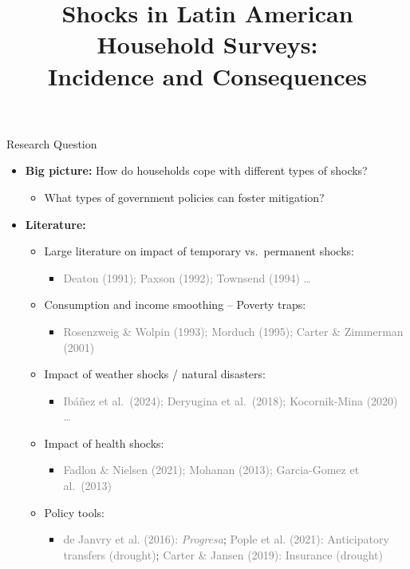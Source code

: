 \documentclass[aspectratio = 169]{beamer}
\title[]{Shocks in Latin American Household Surveys: \\ Incidence and Consequences}
\date{
	
	April 2025}
\begin{document}
\begin{frame}
  \titlepage
\end{frame}
\begin{frame}{Research Question}

	\begin{itemize}
  
	  \item \textbf{Big picture:} How do households cope with different types of shocks?
		\begin{itemize}
		  \item What types of government policies can foster mitigation?
		\end{itemize}
		\bigskip
  
	  \item \textbf{Literature:}
		\begin{itemize}
  
		  \item Large literature on impact of temporary vs.\ permanent shocks:
			\begin{itemize}
			  \item \textcolor{gray}{Deaton (1991); Paxson (1992); Townsend (1994) \dots}
			\end{itemize}
			\smallskip
  
		  \item Consumption and income smoothing – Poverty traps:
			\begin{itemize}
			  \item \textcolor{gray}{Rosenzweig \& Wolpin (1993); Morduch (1995); Carter \& Zimmerman (2001)}
			\end{itemize}
			\smallskip
  
		  \item Impact of weather shocks / natural disasters:
			\begin{itemize}
			  \item \textcolor{gray}{Ibáñez et al.\ (2024); Deryugina et al.\ (2018); Kocornik-Mina (2020) \dots}
			\end{itemize}
			\smallskip
  
		  \item Impact of health shocks:
			\begin{itemize}
			  \item \textcolor{gray}{Fadlon \& Nielsen (2021); Mohanan (2013); Garcia-Gomez et al.\ (2013)}
			\end{itemize}
			\smallskip
  
		  \item Policy tools:
			\begin{itemize}
			  \item \textcolor{gray}{de Janvry et al. (2016): \emph{Progresa}}; \textcolor{gray}{Pople et al. (2021): Anticipatory transfers (drought)}; \textcolor{gray}{Carter \& Jansen (2019): Insurance (drought)}
			\end{itemize}
  
		\end{itemize}
  
	\end{itemize}
  
  \end{frame}
  
\end{document}
